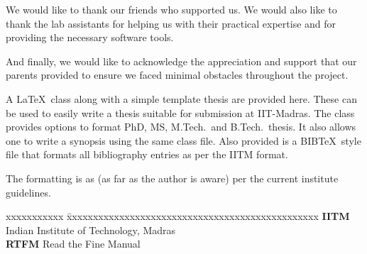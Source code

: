 \documentclass[a4paper, 12pt, oneside]{sastra1}
\begin{document}
	\par We would like to thank our friends who supported us. We would also like to thank the lab assistants for helping us with their practical expertise and for providing the necessary software tools.
	
	\par And finally, we would like to acknowledge the appreciation and support that our parents provided to ensure we faced minimal obstacles throughout the project.
	\pagebreak
	
	\abstract

\begin{doublespace}
	\linespread{2}
	\vspace*{24pt}
	
	\noindent A \LaTeX\ class along with a simple template thesis are provided here.  These can be used to easily write a thesis suitable for submission at IIT-Madras.  The class provides options to format PhD, MS, M.Tech.\ and B.Tech.\ thesis.  It also allows one to write a synopsis using the same class file.  Also provided is a BIB\TeX\ style file that formats all bibliography entries as per the IITM format.
	
	The formatting is as (as far as the author is aware) per the current institute guidelines.
	
\end{doublespace}
\pagebreak
	
\begin{singlespace}
	\tableofcontents
	\thispagestyle{empty}
	
	
	\listoffigures
	\listoftables
\end{singlespace}


\abbreviations

\noindent 
\begin{tabbing}
	xxxxxxxxxxx \= xxxxxxxxxxxxxxxxxxxxxxxxxxxxxxxxxxxxxxxxxxxxxxxx \kill
	\textbf{IITM}   \> Indian Institute of Technology, Madras \\
	\textbf{RTFM} \> Read the Fine Manual \\
\end{tabbing}
\end{document}
